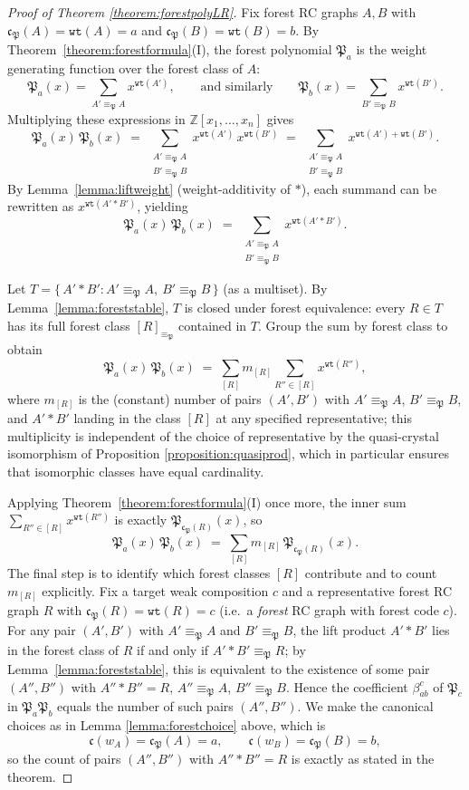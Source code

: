 \documentclass{amsart}
\theoremstyle{definition}
\theoremstyle{remark}
\numberwithin{equation}{subsection}
\newcommand{\wof}[1]{w_{#1}}
\newcommand{\wtt}{\mathtt{wt}}
\newcommand{\code}{\mathfrak{c}}
\newcommand{\forest}{\mathfrak{P}}
\newcommand{\fcode}{\mathfrak{c}_\forest}
\begin{document}
\begin{proof}[Proof of Theorem \ref{theorem:forestpolyLR}]
Fix forest RC graphs $A, B$ with $\code_\forest(A)=\wtt(A)=a$ and $\code_\forest(B)=\wtt(B)=b$. By Theorem~\ref{theorem:forestformula}(I), the forest polynomial $\forest_a$ is the weight generating function over the forest class of $A$:
$$\forest_a(x) = \sum_{A'\equiv_\forest A} x^{\wtt(A')},\qquad\text{and similarly}\qquad \forest_b(x) = \sum_{B'\equiv_\forest B} x^{\wtt(B')}.$$
Multiplying these expressions in $\mathbb{Z}[x_1,\ldots,x_n]$ gives
$$\forest_a(x)\,\forest_b(x) \;=\; \sum_{\substack{A'\equiv_\forest A\\ B'\equiv_\forest B}} x^{\wtt(A')}\,x^{\wtt(B')}\;=\;\sum_{\substack{A'\equiv_\forest A\\ B'\equiv_\forest B}} x^{\wtt(A')+\wtt(B')}.$$
By Lemma~\ref{lemma:liftweight} (weight-additivity of $*$), each summand can be rewritten as $x^{\wtt(A'*B')}$, yielding
$$\forest_a(x)\,\forest_b(x) \;=\; \sum_{\substack{A'\equiv_\forest A\\ B'\equiv_\forest B}} x^{\wtt(A'*B')}.$$

Let $T = \{\,A'*B' : A'\equiv_\forest A,\ B'\equiv_\forest B\,\}$ (as a multiset). By Lemma~\ref{lemma:foreststable}, $T$ is closed under forest equivalence: every $R\in T$ has its full forest class $[R]_{\equiv_\forest}$ contained in $T$. Group the sum by forest class to obtain
$$\forest_a(x)\,\forest_b(x) \;=\; \sum_{[R]} m_{[R]}\sum_{R''\in[R]} x^{\wtt(R'')},$$
where $m_{[R]}$ is the (constant) number of pairs $(A',B')$ with $A'\equiv_\forest A$, $B'\equiv_\forest B$, and $A'*B'$ landing in the class $[R]$ at any specified representative; this multiplicity is independent of the choice of representative by the quasi-crystal isomorphism of Proposition \ref{proposition:quasiprod}, which in particular ensures that isomorphic classes have equal cardinality.

Applying Theorem~\ref{theorem:forestformula}(I) once more, the inner sum $\sum_{R''\in[R]}x^{\wtt(R'')}$ is exactly $\forest_{\fcode(R)}(x)$, so
$$\forest_a(x)\,\forest_b(x) \;=\; \sum_{[R]} m_{[R]}\,\forest_{\fcode(R)}(x).$$
The final step is to identify which forest classes $[R]$ contribute and to count $m_{[R]}$ explicitly. Fix a target weak composition $c$ and a representative forest RC graph $R$ with $\code_\forest(R)=\wtt(R)=c$ (i.e.\ a \emph{forest} RC graph with forest code $c$). For any pair $(A',B')$ with $A'\equiv_\forest A$ and $B'\equiv_\forest B$, the lift product $A'*B'$ lies in the forest class of $R$ if and only if $A'*B'\equiv_\forest R$; by Lemma~\ref{lemma:foreststable}, this is equivalent to the existence of some pair $(A'',B'')$ with $A''*B''=R$, $A''\equiv_\forest A$, $B''\equiv_\forest B$. Hence the coefficient $\beta_{ab}^c$ of $\forest_c$ in $\forest_a\forest_b$ equals the number of such pairs $(A'',B'')$. We make the canonical choices as in Lemma \ref{lemma:forestchoice} above, which is 
$$\code(\wof{A})=\code_\forest(A)=a,\qquad \code(\wof{B})=\code_\forest(B)=b,$$
so the count of pairs $(A'',B'')$ with $A''*B''=R$ is exactly as stated in the theorem.
\end{proof}
\end{document}
